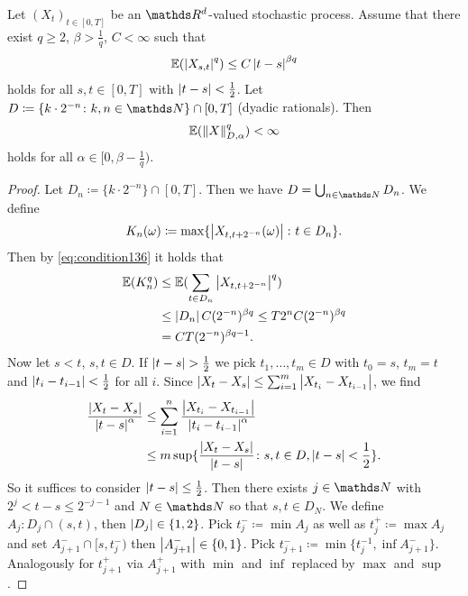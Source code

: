 \begin{thm}
Let $(X_t)_{t\in [0,T]}$ be an $\Rd$-valued stochastic process.
Assume that there exist $q\geq 2$, $\beta >\frac{1}{q}$, $C<\infty$ such that
\begin{align}\label{eq:condition136}
\E{\abs{X_{s,t}}^q} \leq C \abs{t-s}^{\beta q}
\end{align}
holds for all $s,t \in [0,T]$ with $\left\vert t-s\right\vert<\frac{1}{2}$.
Let $D\coloneqq\{k \cdot 2^{-n} \colon k,n \in \N\} \cap [0,T]$ (dyadic rationals).
Then
\begin{align*}
\E{\norm{X}_{D,\alpha}^q}<\infty
\end{align*}
holds for all $\alpha \in [0,\beta-\frac{1}{q})$.
\end{thm}
\begin{proof}
Let $D_n \coloneqq \{k \cdot 2^{-n}\} \cap [0,T]$. Then we have $D=\bigcup_{n\in \N}D_n$.
We define
\begin{align*}
K_n(\omega) \coloneqq \max\{\left\vert X_{t,t+2^{-n}}(\omega)\right\vert\colon t \in D_n\}.
\end{align*}
Then by \eqref{eq:condition136} it holds that
\begin{align*}
\E{K_n^q} &\leq \E{\sum_{t \in D_n} \abs{X_{t,t+2^{-n}}}^q}\\
&\leq \abs{D_n}C (2^{-n})^{\beta q}\leq T 2^n C (2^{-n})^{\beta q}\\
&=C T (2^{-n})^{\beta q-1}.
\end{align*}
Now let $s<t$, $s,t\in D$. If $\left\vert t-s\right\vert>\frac{1}{2}$ we pick $t_1,\dots,t_m\in D$ with $t_0=s$, $t_m=t$ and $\left\vert t_i-t_{i-1}\right\vert<\frac{1}{2}$ for all $i$.
Since $\left\vert X_t-X_s\right\vert \leq \sum_{i=1}^m \left\vert X_{t_i}-X_{t_{i-1}}\right\vert$, we find
\begin{align*}
\frac{\left\vert X_t-X_s\right\vert}{\left\vert t-s\right\vert^\alpha} &\leq \sum_{i=1}^n \frac{\left\vert X_{t_i}-X_{t_{i-1}}\right\vert}{\left\vert t_i-t_{i-1}\right\vert^\alpha}\\
&\leq m \sup\{\frac{\left\vert X_t-X_s\right\vert}{\left\vert t-s\right\vert} \colon s,t \in D, \left\vert t-s\right\vert<\frac{1}{2}\}.
\end{align*}
So it suffices to consider $\left\vert t-s\right\vert\leq \frac{1}{2}$.
Then there exists $j \in \N$ with $2^j<t-s \leq 2^{-j-1}$ and $N \in \N$ so that $s,t \in D_N$.
We define $A_j\colon D_j \cap (s,t)$, then $\left\vert D_j\right\vert \in \{1,2\}$.
Pick $t_j^- \coloneqq \min A_j$ as well as $t_j^+ \coloneqq \max A_j$ and set
$A_{j+1}^- \cap [s,t_j^-)$ then $\left\vert A_{j+1}^-\right\vert\in \{0,1\}$.
Pick $t_{j+1}^-\coloneqq \min\{t_j^{-1}, \inf A_{j+1}^-\}$.
Analogously for $t_{j+1}^+$ via $A_{j+1}^+$ with $\min$ and $\inf$ replaced by $\max$ and $\sup$.

\end{proof}
